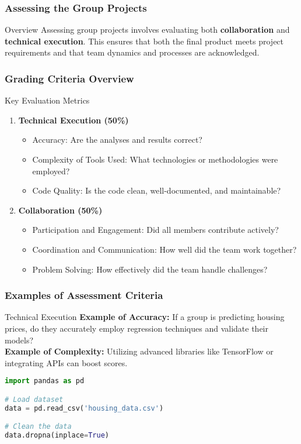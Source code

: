 \documentclass[aspectratio=169]{beamer}
\begin{document}
\begin{frame}
    \frametitle{Assessing the Group Projects}
    \begin{block}{Overview}
        Assessing group projects involves evaluating both \textbf{collaboration} and \textbf{technical execution}. This ensures that both the final product meets project requirements and that team dynamics and processes are acknowledged.
    \end{block}
\end{frame}

\begin{frame}
    \frametitle{Grading Criteria Overview}
    \begin{block}{Key Evaluation Metrics}
        \begin{enumerate}
            \item \textbf{Technical Execution (50\%)} 
            \begin{itemize}
                \item Accuracy: Are the analyses and results correct?
                \item Complexity of Tools Used: What technologies or methodologies were employed?
                \item Code Quality: Is the code clean, well-documented, and maintainable?
            \end{itemize}
            \item \textbf{Collaboration (50\%)} 
            \begin{itemize}
                \item Participation and Engagement: Did all members contribute actively?
                \item Coordination and Communication: How well did the team work together?
                \item Problem Solving: How effectively did the team handle challenges?
            \end{itemize}
        \end{enumerate}
    \end{block}
\end{frame}

\begin{frame}[fragile]
    \frametitle{Examples of Assessment Criteria}
    \begin{block}{Technical Execution}
        \textbf{Example of Accuracy:} If a group is predicting housing prices, do they accurately employ regression techniques and validate their models?
        \\[1em]
        \textbf{Example of Complexity:} Utilizing advanced libraries like TensorFlow or integrating APIs can boost scores.
        \\[1em]
        \begin{lstlisting}[language=Python]
import pandas as pd

# Load dataset
data = pd.read_csv('housing_data.csv')

# Clean the data
data.dropna(inplace=True)
        \end{lstlisting}
    \end{block}
\end{frame}
\end{document}

